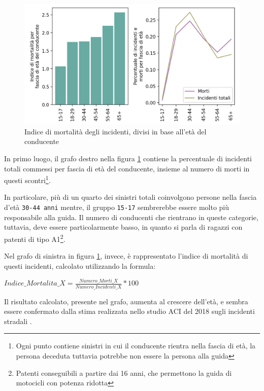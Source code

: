 \documentclass[a4paper,12pt]{report}
\newcommand{\columnstyle}[1]{\texttt{#1}}
\begin{document}
\begin{figure}
    \includegraphics[width=\linewidth]{../src/incidenti/incidenti_senza_coords/mortalita/indice_mortalita_eta.png}
    \caption{Indice di mortalità degli incidenti, divisi in base all'età del conducente}
    \label{fig:indice-mortalita-eta}
\end{figure}

In primo luogo, il grafo destro nella figura \ref{fig:indice-mortalita-eta} contiene 
la percentuale di incidenti totali commessi per fascia di età del conducente, insieme 
al numero di morti in questi scontri\footnote{Ogni punto contiene sinistri in 
cui il conducente rientra nella fascia di età, la persona deceduta tuttavia potrebbe non 
essere la persona alla guida}. 

In particolare, più di un quarto dei sinistri totali coinvolgono persone nella 
fascia d'età \columnstyle{30-44 anni} mentre, il gruppo \columnstyle{15-17} sembrerebbe 
essere molto più responsabile alla guida. Il numero di conducenti che rientrano 
in queste categorie, tuttavia, deve essere particolarmente basso, in quanto si 
parla di ragazzi con patenti di tipo A1\footnote{Patenti conseguibili a partire dai 16 anni, 
che permettono la guida di motocicli con potenza ridotta}. 

Nel grafo di sinistra in figura \ref{fig:indice-mortalita-eta}, invece, 
è rappresentato l'indice di mortalità di questi incidenti, 
calcolato utilizzando la formula: 

\begin{center}
    $Indice\_Mortalita\_X = \displaystyle \frac{Numero\_Morti\_X}{Numero\_Incidenti\_X} * 100$ 
\end{center}

Il risultato calcolato, presente nel grafo, aumenta al crescere dell'età, 
e sembra essere confermato dalla stima realizzata nello studio 
ACI del 2018 sugli incidenti stradali \cite{ACI:3}. 
\end{document}
